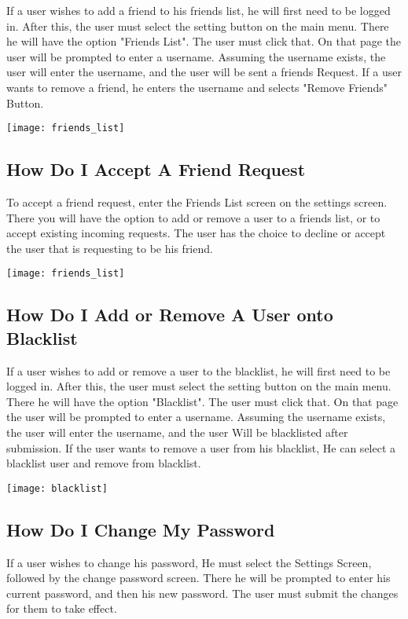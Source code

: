 \documentclass[english]{article}
\begin{document}
If a user wishes to add a friend to his friends list, he will first need to be logged in. After this, the user must select the setting button on the main menu. There he will have the option "Friends List". The user must click that. On that page the user will be prompted to enter a username. Assuming the username exists, the user will enter the username, and the user will be sent a friends Request. If a user wants to remove a friend, he enters the username and selects "Remove Friends" Button.

\texttt{[image: friends\_list]}

\subsection{How Do I Accept A Friend Request}

To accept a friend request, enter the Friends List screen on the settings screen. There you will have the option to add or remove a user to a friends list, or to accept existing incoming requests. The user has the choice to decline or accept the user that is requesting to be his friend. 


\texttt{[image: friends\_list]}

\subsection{How Do I Add or Remove A User onto Blacklist}

If a user wishes to add or remove a user to the blacklist, he will first need to be logged in. After this, the user must select the setting button on the main menu. There he will have the option "Blacklist". The user must click that. On that page the user will be prompted to enter a username. Assuming the username exists, the user will enter the username, and the user Will be blacklisted after submission. If the user wants to remove a user from his blacklist, He can select a blacklist user and remove from blacklist. 

\texttt{[image: blacklist]}

\subsection{How Do I Change My Password}

If a user wishes to change his password, He must select the Settings Screen, followed by the change password screen. There he will be prompted to enter his current password, and then his new password. The user must submit the changes for them to take effect.
\end{document}
